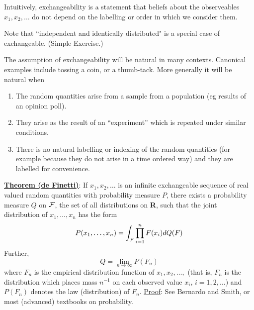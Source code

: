 \documentclass{article}
\begin{document}
Intuitively,
exchangeability is a statement that beliefs about the observeables
$x_1,x_2,\ldots$ do not depend on the labelling or order in which we
consider them.

Note that ``independent and identically distributed" is a special case of exchangeable.  (Simple Exercise.)

\vskip 4mm
The assumption of exchangeability will be natural in many contexts. Canonical examples include tossing a coin, or a thumb-tack. More generally it will be natural when
\begin{enumerate}
\item The random quantities arise from a sample from a population (eg results of an opinion poll).
\item They arise as the result of an ``experiment'' which is repeated
  under similar conditions.
\item There is no natural labelling or indexing of the random
  quantities (for example because they do not arise in a time ordered
  way) and they are labelled for convenience.
\end{enumerate}
\vskip 6mm
\underline{\bf Theorem (de Finetti)}:  If $x_1,x_2,\ldots$ is an
infinite exchangeable sequence of real valued random quantities with
probability measure $P$, there exists a probability measure $Q$ on $\cal{F}$, the
set of all distributions on {\bf R}, such that the joint distribution
of $x_1,\ldots,x_n$ has the form
$$P(x_1,\ldots,x_n)=\int_{\cal{F}} \prod_{i=1}^n F(x_i)dQ(F)$$
Further,
\begin{equation}
Q=\lim_{n\to\infty} P(F_n)
\end{equation}
where $F_n$ is the empirical distribution function of
$x_1,x_2,\ldots,$ (that is, $F_n$ is the distribution which places mass $n^{-1}$
on each observed value $x_i$, $i=1,2,\ldots$)
and $P(F_n)$ denotes the law (distribution) of $F_n$.
\vskip 4mm
\underline{Proof}:  See Bernardo and Smith, or most (advanced) textbooks on probability. 
\end{document}
